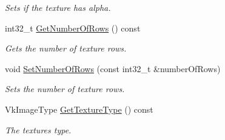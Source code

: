 \begin{DoxyCompactItemize}
\begin{DoxyCompactList}\small\item\em Sets if the texture has alpha. \end{DoxyCompactList}\item 
int32\+\_\+t \hyperlink{class_flounder_1_1_texture_a8428b6733ac13ea3c4bce350cfcfca31}{Get\+Number\+Of\+Rows} () const
\begin{DoxyCompactList}\small\item\em Gets the number of texture rows. \end{DoxyCompactList}\item 
void \hyperlink{class_flounder_1_1_texture_a177ad1438462338b553861919c64c6f7}{Set\+Number\+Of\+Rows} (const int32\+\_\+t \&number\+Of\+Rows)
\begin{DoxyCompactList}\small\item\em Sets the number of texture rows. \end{DoxyCompactList}\item 
Vk\+Image\+Type \hyperlink{class_flounder_1_1_texture_a9173fbc8dce9bdc5ff6f7de87bcb6b47}{Get\+Texture\+Type} () const
\begin{DoxyCompactList}\small\item\em The textures type. \end{DoxyCompactList}\end{DoxyCompactItemize}
